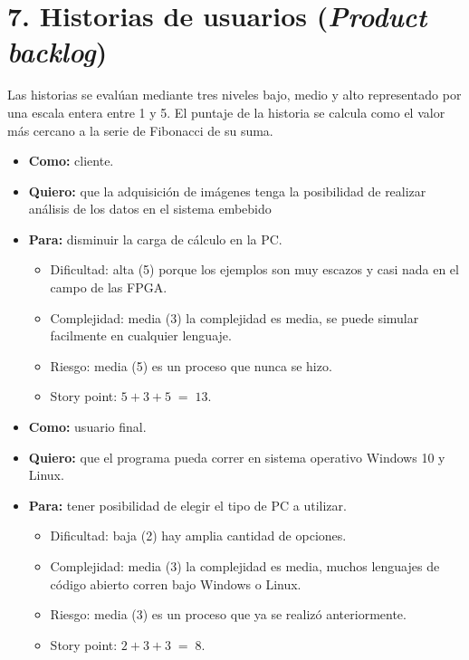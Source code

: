 \documentclass[
11pt, %
codirector, %
]{charter}
\begin{document}
\section{7. Historias de usuarios (\textit{Product backlog})}
\label{sec:backlog}
Las historias se evalúan mediante tres niveles bajo, medio y alto representado por una escala entera entre 1 y 5. El puntaje de la historia se calcula como el valor más cercano a la serie de Fibonacci de su suma.

\begin{itemize}
\item \textbf{Como:} cliente. 
\item \textbf{Quiero:} que la adquisición de imágenes tenga la posibilidad de realizar análisis de los datos en el sistema embebido
\item \textbf{Para:} disminuir la carga de cálculo en la PC.
\begin{itemize}
\item Dificultad: alta (5) porque los ejemplos son muy escazos y casi nada en el campo de las FPGA.
\item Complejidad: media (3) la complejidad es media, se puede simular facilmente en cualquier lenguaje.
\item Riesgo: media (5) es un proceso que nunca se hizo.
\item Story point: $5+3+5\;=\;13$.
\end{itemize}
\end{itemize}

\begin{itemize}
\item \textbf{Como:} usuario final.
\item \textbf{Quiero:} que el programa pueda correr en sistema operativo Windows 10 y Linux.
\item \textbf{Para:} tener posibilidad de elegir el tipo de PC a utilizar.
\begin{itemize}
\item Dificultad: baja (2) hay amplia cantidad de opciones.
\item Complejidad: media (3) la complejidad es media, muchos lenguajes de código abierto corren bajo Windows o Linux.
\item Riesgo: media (3) es un proceso que ya se realizó anteriormente.
\item Story point: $2+3+3\;=\;8$.
\end{itemize}
\end{itemize}
\end{document}
